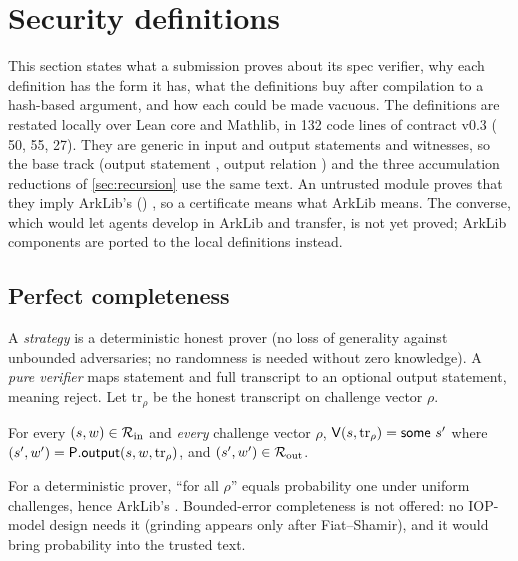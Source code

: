\section{Security definitions}\label{sec:security}

This section states what a submission proves about its spec verifier, why each definition has the
form it has, what the definitions buy after compilation to a hash-based argument, and how each could
be made vacuous. The definitions are restated locally over Lean core and Mathlib, in 132 code
lines of contract v0.3 ( 50,  55,  27). They are generic in input and output statements and witnesses, so the base track
(output statement , output relation ) and the three accumulation
reductions of \cref{sec:recursion} use the same text. An untrusted  module proves
that they imply ArkLib's  ()
\cite{arklib2026}, so a certificate means what ArkLib means. The converse, which would let agents
develop in ArkLib and transfer, is not yet proved; ArkLib components are ported to the local
definitions instead.

\subsection{Perfect completeness}\label{subsec:sec-completeness}

A \emph{strategy} is a deterministic honest prover (no loss of generality against unbounded
adversaries; no randomness is needed without zero knowledge). A \emph{pure verifier} maps statement
and full transcript to an optional output statement,  meaning reject. Let
$\mathrm{tr}_\rho$ be the honest transcript on challenge vector $\rho$.

\begin{definition}\label{def:sec-complete}
For every $(s,w)\in\mathcal{R}_{\mathrm{in}}$ and \emph{every} challenge vector $\rho$,
$\Vrf(s,\mathrm{tr}_\rho)=\mathsf{some}\ s'$ where $(s',w')=\mathsf{P}.\mathsf{output}(s,w,\mathrm{tr}_\rho)$,
and $(s',w')\in\mathcal{R}_{\mathrm{out}}$.
\end{definition}

\noindent For a deterministic prover, \enquote{for all $\rho$} equals probability one under
uniform challenges, hence ArkLib's . Bounded-error completeness is not
offered: no IOP-model design needs it (grinding appears only after Fiat--Shamir), and it would bring
probability into the trusted text.

